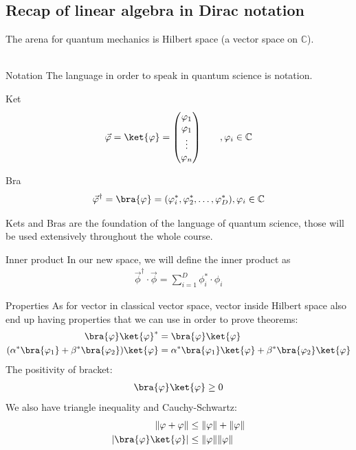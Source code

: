 \subsection{Recap of linear algebra in Dirac notation}
The arena for quantum mechanics is Hilbert space (a vector space on $\mathbb{C}$).\\
$ $\\
\begin{parag}{Notation}
	The language in order to speak in quantum science is  notation.
	\begin{definition}{Ket}
    \begin{align*} 
    	\vec{\phi} =  \ket{\phi} = \begin{pmatrix} \phi_1 \\ \phi_1 \\ \vdots \\ \phi_n \end{pmatrix} \mathspace \mathspace, \phi_i \in \mathbb{C}\\
    \end{align*}
	\end{definition}
	\begin{definition}{Bra}
	\begin{align*} 
		\vec{\phi}^{\dagger} = \bra{\phi} =  \left(\phi_i^\ast, \phi_2^{\ast}, \ldots, \phi_D^{\ast}\right), \phi_i \in \mathbb{C}
	\end{align*}
	\end{definition}
	Kets and Bras are the foundation of the language of quantum science, those will be used extensively throughout the whole course.
	\begin{definition}{Inner product}
	In  our new space, we will define the inner product as 
	\begin{align*} 
		\vec{\phi}^{\dagger} \cdot \vec{\phi} =  \sum_{i= 1}^{D} \phi_i^{\ast} \cdot \phi_i 
	\end{align*}
	\end{definition}
\end{parag}


\begin{parag}{Properties}
	As for vector in classical vector space, vector inside Hilbert space also end up having properties that we can use in order to prove theorems:
    \begin{align*} 
		\bra{\phi}\ket{\varphi}^{\ast} &= \bra{\varphi}\ket{\phi}\\
		\left(\alpha^\ast\bra{\phi_1} + \beta^{\ast}\bra{\phi_2}\right) \ket{\varphi} &= \alpha^\ast \bra{\phi_1}\ket{\varphi} + \beta^{\ast}\bra{\phi_2}\ket{\varphi}
    \end{align*}
	The positivity of bracket:
	\begin{align*} 
		\bra{\phi}\ket{\phi} \geq 0
	\end{align*}
	We also have triangle inequality and Cauchy-Schwartz:
	\begin{align*} 
		\left\|\phi + \varphi\right\| &\leq \left\|\phi\right\| + \left\|\varphi\right\|\\
		\left|\bra{\phi}\ket{\varphi}\right| &\leq \left\|\phi\right\|\left\|\varphi\right\|
	\end{align*}
\end{parag}


